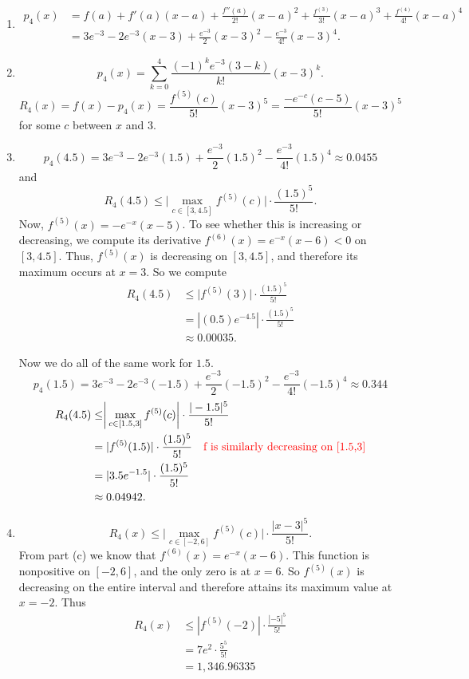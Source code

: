 \documentclass[noinstructornotes]{ximera}
\begin{document}
\begin{problem}
\begin{freeResponse}
\begin{enumerate}
	\item  
		\begin{align*}
		p_4(x) &= f(a) + f'(a)(x-a) + \frac{f''(a)}{2!}(x-a)^2 + \frac{f^{(3)}}{3!}(x-a)^3 + \frac{f^{(4)}}{4!}(x-a)^4  \\
		&= 3e^{-3} -2e^{-3}(x-3) + \frac{e^{-3}}{2}(x-3)^2 - \frac{e^{-3}}{4!}(x-3)^4.
		\end{align*}
	
	\item  
		\[
		p_4(x) = \sum_{k=0}^4 \frac{(-1)^k e^{-3} (3-k)}{k!}(x-3)^k.
		\]
		\[
		R_4(x) = f(x)-p_4(x) = \frac{f^{(5)}(c)}{5!}(x-3)^5 = \frac{-e^{-c} (c-5)}{5!}(x-3)^5
		\]
	for some $c$ between $x$ and $3$.
	
	\item  
		\[
		p_4(4.5) = 3e^{-3} - 2e^{-3}(1.5) + \frac{e^{-3}}{2}(1.5)^2 - \frac{e^{-3}}{4!}(1.5)^4 \approx 0.0455
		\]
	and
		\[
		R_4(4.5) \leq \biggr| \max_{c \in [3,4.5]} f^{(5)}(c) \biggr| \cdot \frac{(1.5)^5}{5!}.
		\]
	Now, $f^{(5)}(x) = -e^{-x}(x-5)$.  
	To see whether this is increasing or decreasing, we compute its derivative $f^{(6)}(x) = e^{-x}(x-6) < 0$ on $[3,4.5]$.  
	Thus, $f^{(5)}(x)$ is decreasing on $[3,4.5]$, and therefore its maximum occurs at $x=3$.  
	So we compute
		\begin{align*}
		R_4(4.5) &\leq \biggr| f^{(5)}(3) \biggr| \cdot \frac{(1.5)^5}{5!}  \\
		&= |(0.5)e^{-4.5}| \cdot \frac{(1.5)^5}{5!}  \\
		&\approx 0.00035.
		\end{align*}
		
	Now we do all of the same work for $1.5$.  
		\[
		p_4(1.5) = 3e^{-3} - 2e^{-3}(-1.5) + \frac{e^{-3}}{2}(-1.5)^2 - \frac{e^{-3}}{4!}(-1.5)^4 \approx 0.344
		\]
		\begin{align*}
		R_4(4.5) &\leq \biggr| \max_{c \in [1.5,3]} f^{(5)}(c) \biggr| \cdot \frac{|-1.5|^5}{5!} \\
		&= | f^{(5)}(1.5) | \cdot \frac{(1.5)^5}{5!}  \quad {\color{red}\text{f is similarly decreasing on [1.5,3]}}\\
		&= | 3.5 e^{-1.5} |  \cdot \frac{(1.5)^5}{5!}  \\
		&\approx 0.04942.
		\end{align*}
	
	\item  
		\[
		R_4(x) \leq \biggr| \max_{c \in [-2,6]} f^{(5)}(c) \biggr| \cdot \frac{|x-3|^5}{5!}.
		\]
	From part (c) we know that $f^{(6)}(x) = e^{-x}(x-6)$.  
	This function is nonpositive on $[-2,6]$, and the only zero is at $x=6$.  
	So $f^{(5)}(x)$ is decreasing on the entire interval and therefore attains its maximum value at $x=-2$.  
	Thus
		\begin{align*}
		R_4(x) &\leq |f^{(5)}(-2)| \cdot \frac{|-5|^5}{5!}  \\
		&= 7e^2 \cdot \frac{5^5}{5!}  \\
		&= 1,346.96335
		\end{align*}
	

\end{enumerate}
\end{freeResponse}
\end{problem}
\end{document}
